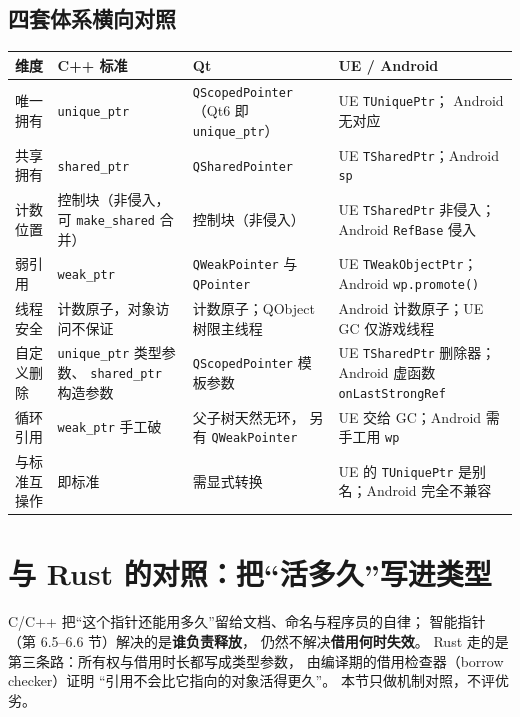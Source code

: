 \documentclass[12pt,a4paper,fontset=fandol]{ctexbook}
\begin{document}
\subsection{四套体系横向对照}

\begin{longtable}{@{}>{\raggedright\arraybackslash}p{}>{\raggedright\arraybackslash}p{}>{\raggedright\arraybackslash}p{}>{\raggedright\arraybackslash}p{}@{}}
\toprule
\textbf{维度} & \textbf{C++ 标准} & \textbf{Qt} & \textbf{UE / Android} \\
\midrule
唯一拥有 & \texttt{unique\_ptr} & \texttt{QScopedPointer}
  （Qt6 即 \texttt{unique\_ptr}） & UE \texttt{TUniquePtr}；
  Android 无对应 \\
\addlinespace
共享拥有 & \texttt{shared\_ptr} & \texttt{QSharedPointer} &
  UE \texttt{TSharedPtr}；Android \texttt{sp} \\
\addlinespace
计数位置 & 控制块（非侵入，可 \texttt{make\_shared} 合并） &
  控制块（非侵入） & UE \texttt{TSharedPtr} 非侵入；
  Android \texttt{RefBase} 侵入 \\
\addlinespace
弱引用 & \texttt{weak\_ptr} & \texttt{QWeakPointer} 与 \texttt{QPointer} &
  UE \texttt{TWeakObjectPtr}；Android \texttt{wp.promote()} \\
\addlinespace
线程安全 & 计数原子，对象访问不保证 & 计数原子；QObject 树限主线程 &
  Android 计数原子；UE GC 仅游戏线程 \\
\addlinespace
自定义删除 & \texttt{unique\_ptr} 类型参数、
  \texttt{shared\_ptr} 构造参数 & \texttt{QScopedPointer} 模板参数 &
  UE \texttt{TSharedPtr} 删除器；Android 虚函数
  \texttt{onLastStrongRef} \\
\addlinespace
循环引用 & \texttt{weak\_ptr} 手工破 & 父子树天然无环，
  另有 \texttt{QWeakPointer} &
  UE 交给 GC；Android 需手工用 \texttt{wp} \\
\addlinespace
与标准互操作 & 即标准 & 需显式转换 & UE 的 \texttt{TUniquePtr}
  是别名；Android 完全不兼容 \\
\bottomrule
\end{longtable}

\section{与 Rust 的对照：把``活多久''写进类型}

C/C++ 把``这个指针还能用多久''留给文档、命名与程序员的自律；
智能指针（第 6.5--6.6 节）解决的是\textbf{谁负责释放}，
仍然不解决\textbf{借用何时失效}。
Rust 走的是第三条路：所有权与借用时长都写成类型参数，
由编译期的借用检查器（borrow checker）证明
``引用不会比它指向的对象活得更久''。
本节只做机制对照，不评优劣。
\end{document}
